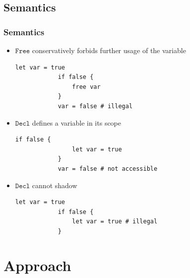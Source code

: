 \documentclass{EESD}
\begin{document}
\subsection{Semantics}

\begin{frame}[fragile]
    \frametitle{Semantics}
    \begin{itemize}
        \item $\texttt{Free}$ conservatively forbids further usage of the variable
              \begin{lstlisting}[gobble=12, numbers=none, basicstyle=\linespread{0.89}\tt\scriptsize]
            let var = true
            if false {
                free var
            }
            var = false # illegal
        \end{lstlisting}
        \item $\texttt{Decl}$ defines a variable in its scope
              \begin{lstlisting}[gobble=12, numbers=none, basicstyle=\linespread{0.89}\tt\scriptsize]
            if false {
                let var = true
            }
            var = false # not accessible
        \end{lstlisting}
        \item $\texttt{Decl}$ cannot shadow
              \begin{lstlisting}[gobble=12, numbers=none, basicstyle=\linespread{0.89}\tt\scriptsize]
            let var = true
            if false {
                let var = true # illegal
            }
        \end{lstlisting}
    \end{itemize}
\end{frame}


\section{Approach}


\end{document}
